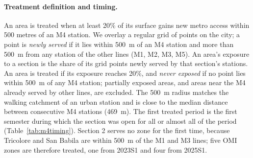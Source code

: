 \paragraph{Treatment definition and timing.} An area is treated when at least 20\% of its surface gains new metro access within 500 metres of an M4 station. We overlay a regular grid of points on the city; a point is \textit{newly served} if it lies within 500~m of an M4 station and more than 500~m from any station of the other lines (M1, M2, M3, M5). An area's exposure to a section is the share of its grid points newly served by that section's stations. An area is treated if its exposure reaches 20\%, and \textit{never exposed} if no point lies within 500~m of any M4 station; partially exposed areas, and areas near the M4 already served by other lines, are excluded. The 500~m radius matches the walking catchment of an urban station and is close to the median distance between consecutive M4 stations (469~m). The first treated period is the first semester during which the section was open for all or almost all of the period (Table~\ref{tab:m4timing}). Section 2 serves no zone for the first time, because Tricolore and San Babila are within 500~m of the M1 and M3 lines; five OMI zones are therefore treated, one from 2023S1 and four from 2025S1.

\begin{table}[tbhp]
\centering
\caption{M4 opening dates and treated OMI zones (500~m catchment, 20\% exposure threshold)}
\label{tab:m4timing}
\end{table}

